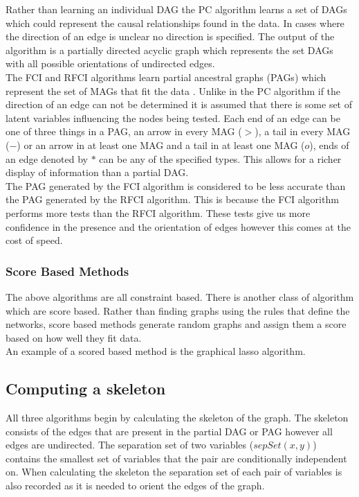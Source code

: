 \documentclass{article}
\begin{document}
Rather than learning an individual DAG the PC algorithm learns a set of DAGs which could represent the causal relationships found in the data. In cases where the direction of an edge is unclear no direction is specified. The output of the algorithm is a partially directed acyclic graph which represents the set DAGs with all possible orientations of undirected edges\cite{spirtes1991algorithm}.
\\

The FCI and RFCI algorithms learn partial ancestral graphs (PAGs) which represent the set of MAGs that fit the data \cite{colombo2012learning}. Unlike in the PC algorithm if the direction of an edge can not be determined it is assumed that there is some set of latent variables influencing the nodes being tested. Each end of an edge can be one of three things in a PAG, an arrow in every MAG ($>$), a tail in every MAG ($-$) or an arrow in at least one MAG and a tail in at least one MAG ($o$), ends of an edge denoted by $*$ can be any of the specified types. This allows for a richer display of information than a partial DAG\cite{colombo2012learning}.
\\

The PAG generated by the FCI algorithm is considered to be less accurate than the PAG generated by the RFCI algorithm. This is because the FCI algorithm performs more tests than the RFCI algorithm. These tests give us more confidence in the presence and the orientation of edges however this comes at the cost of speed.
\\
\subsubsection{Score Based Methods}
The above algorithms are all constraint based. There is another class of algorithm which are score based. Rather than finding graphs using the rules that define the networks, score based methods generate random graphs and assign them a score based on how well they fit data.\\

An example of a scored based method is the graphical lasso algorithm. 
   
\subsection{Computing a skeleton}
All three algorithms begin by calculating the skeleton of the graph. The skeleton consists of the edges that are present in the partial DAG or PAG however all edges are undirected. The separation set of two variables ($sepSet(x,y)$) contains the smallest set of variables that the pair are conditionally independent on.  When calculating the skeleton the separation set of each pair of variables is also recorded as it is needed to orient the edges of the graph\cite{colombo2012learning, spirtes1991algorithm}.
\\
\end{document}
